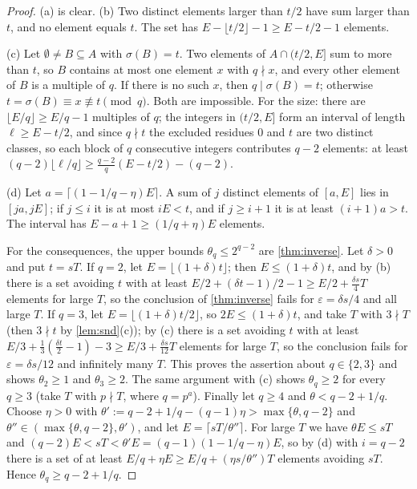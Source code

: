 \documentclass[11pt,reqno]{amsart}
\numberwithin{equation}{section}
\theoremstyle{definition}
\theoremstyle{remark}
\newcommand{\eps}{\varepsilon}
\newcommand{\floor}[1]{\lfloor #1\rfloor}
\newcommand{\ceil}[1]{\lceil #1\rceil}
\begin{document}
\begin{proof}
(a) is clear. (b) Two distinct elements larger than $t/2$ have sum larger than $t$, and no element equals $t$. The set has $E-\floor{t/2}-1\ge E-t/2-1$ elements.

(c) Let $\emptyset\ne B\subseteq A$ with $\sigma(B)=t$. Two elements of $A\cap(t/2,E]$ sum to more than $t$, so $B$ contains at most one element $x$ with $q\nmid x$, and every other element of $B$ is a multiple of $q$. If there is no such $x$, then $q\mid\sigma(B)=t$; otherwise $t=\sigma(B)\equiv x\not\equiv t\pmod q$. Both are impossible. For the size: there are $\floor{E/q}\ge E/q-1$ multiples of $q$; the integers in $(t/2,E]$ form an interval of length $\ell\ge E-t/2$, and since $q\nmid t$ the excluded residues $0$ and $t$ are two distinct classes, so each block of $q$ consecutive integers contributes $q-2$ elements: at least $(q-2)\floor{\ell/q}\ge\frac{q-2}q(E-t/2)-(q-2)$.

(d) Let $a=\ceil{(1-1/q-\eta)E}$. A sum of $j$ distinct elements of $[a,E]$ lies in $[ja,jE]$; if $j\le i$ it is at most $iE<t$, and if $j\ge i+1$ it is at least $(i+1)a>t$. The interval has $E-a+1\ge(1/q+\eta)E$ elements.

For the consequences, the upper bounds $\theta_q\le2^{q-2}$ are \cref{thm:inverse}. Let $\delta>0$ and put $t=sT$. If $q=2$, let $E=\floor{(1+\delta)t}$; then $E\le(1+\delta)t$, and by (b) there is a set avoiding $t$ with at least $E/2+(\delta t-1)/2-1\ge E/2+\frac{\delta s}4T$ elements for large $T$, so the conclusion of \cref{thm:inverse} fails for $\eps=\delta s/4$ and all large $T$. If $q=3$, let $E=\floor{(1+\delta)t/2}$, so $2E\le(1+\delta)t$, and take $T$ with $3\nmid T$ (then $3\nmid t$ by \cref{lem:snd}(c)); by (c) there is a set avoiding $t$ with at least $E/3+\frac13(\frac{\delta t}2-1)-3\ge E/3+\frac{\delta s}{12}T$ elements for large $T$, so the conclusion fails for $\eps=\delta s/12$ and infinitely many $T$. This proves the assertion about $q\in\{2,3\}$ and shows $\theta_2\ge1$ and $\theta_3\ge2$. The same argument with (c) shows $\theta_q\ge2$ for every $q\ge3$ (take $T$ with $p\nmid T$, where $q=p^a$). Finally let $q\ge4$ and $\theta<q-2+1/q$. Choose $\eta>0$ with $\theta':=q-2+1/q-(q-1)\eta>\max\{\theta,q-2\}$ and $\theta''\in(\max\{\theta,q-2\},\theta')$, and let $E=\ceil{sT/\theta''}$. For large $T$ we have $\theta E\le sT$ and $(q-2)E<sT<\theta'E=(q-1)(1-1/q-\eta)E$, so by (d) with $i=q-2$ there is a set of at least $E/q+\eta E\ge E/q+(\eta s/\theta'')T$ elements avoiding $sT$. Hence $\theta_q\ge q-2+1/q$.
\end{proof}
\end{document}
